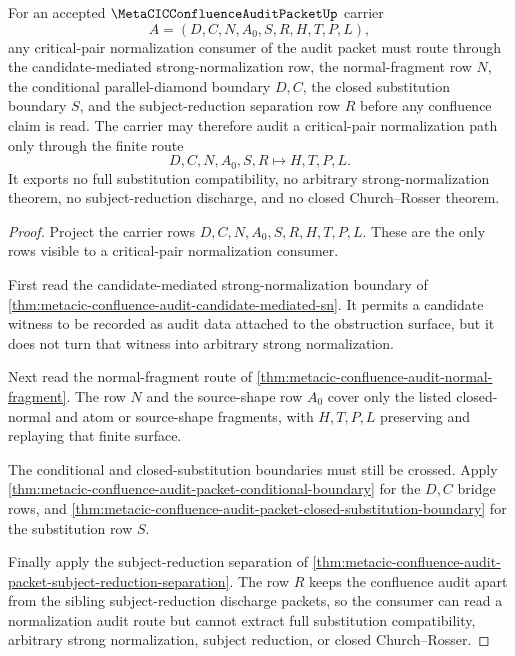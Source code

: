 \begin{theorem}
\label{thm:metacic-confluence-audit-critical-pair-normalization}
For an accepted $\MetaCICConfluenceAuditPacketUp$ carrier
$$
A=(D,C,N,A_0,S,R,H,T,P,L),
$$
any critical-pair normalization consumer of the audit packet must route through the candidate-mediated strong-normalization row, the normal-fragment row $N$, the conditional parallel-diamond boundary $D,C$, the closed substitution boundary $S$, and the subject-reduction separation row $R$ before any confluence claim is read. The carrier may therefore audit a critical-pair normalization path only through the finite route
$$
D,C,N,A_0,S,R \longmapsto H,T,P,L.
$$
It exports no full substitution compatibility, no arbitrary strong-normalization theorem, no subject-reduction discharge, and no closed Church--Rosser theorem.
\end{theorem}
\begin{proof}
Project the carrier rows $D,C,N,A_0,S,R,H,T,P,L$. These are the only rows visible to a critical-pair normalization consumer.

First read the candidate-mediated strong-normalization boundary of \autoref{thm:metacic-confluence-audit-candidate-mediated-sn}. It permits a candidate witness to be recorded as audit data attached to the obstruction surface, but it does not turn that witness into arbitrary strong normalization.

Next read the normal-fragment route of \autoref{thm:metacic-confluence-audit-normal-fragment}. The row $N$ and the source-shape row $A_0$ cover only the listed closed-normal and atom or source-shape fragments, with $H,T,P,L$ preserving and replaying that finite surface.

The conditional and closed-substitution boundaries must still be crossed. Apply \autoref{thm:metacic-confluence-audit-packet-conditional-boundary} for the $D,C$ bridge rows, and \autoref{thm:metacic-confluence-audit-packet-closed-substitution-boundary} for the substitution row $S$.

Finally apply the subject-reduction separation of \autoref{thm:metacic-confluence-audit-packet-subject-reduction-separation}. The row $R$ keeps the confluence audit apart from the sibling subject-reduction discharge packets, so the consumer can read a normalization audit route but cannot extract full substitution compatibility, arbitrary strong normalization, subject reduction, or closed Church--Rosser.
\end{proof}

